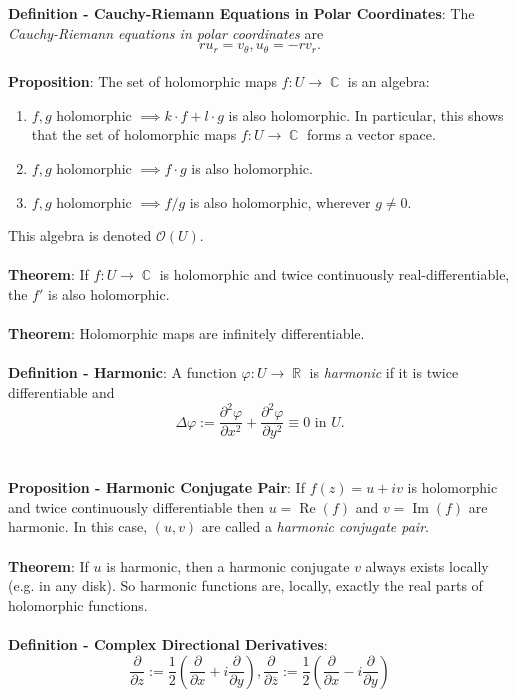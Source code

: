\documentclass{article}
\DeclareMathOperator{\R}{\mathbb{R}}
\DeclareMathOperator{\C}{\mathbb{C}}
\DeclareMathOperator{\re}{Re}
\DeclareMathOperator{\im}{Im}
\begin{document}
\textbf{Definition - Cauchy-Riemann Equations in Polar Coordinates}: The \textit{Cauchy-Riemann equations in polar coordinates} are $$ru_r = v_\theta, u_\theta = -rv_r.$$ \\
\textbf{Proposition}: The set of holomorphic maps $f: U \rightarrow \C$ is an algebra: \begin{enumerate}
    \item $f, g$ holomorphic $\implies k \cdot f + l \cdot g$ is also holomorphic. In particular, this shows that the set of holomorphic maps $f: U \rightarrow \C$ forms a vector space.
    \item $f, g$ holomorphic $\implies f \cdot g$ is also holomorphic.
    \item $f, g$ holomorphic $\implies f / g$ is also holomorphic, wherever $g \neq 0$.
\end{enumerate} This algebra is denoted $\mathcal{O}(U)$. \\\ \\
\textbf{Theorem}: If $f: U \rightarrow \C$ is holomorphic and twice continuously real-differentiable, the $f'$ is also holomorphic. \\ \\
\textbf{Theorem}: Holomorphic maps are infinitely differentiable. \\ \\
\textbf{Definition - Harmonic}: A function $\varphi: U \rightarrow \R$ is \textit{harmonic} if it is twice differentiable and $$\Delta \varphi := \frac{\partial^2 \varphi}{\partial x^2} + \frac{\partial^2 \varphi}{\partial y^2} \equiv 0 \text{ in } U.$$ \\ \\
\textbf{Proposition - Harmonic Conjugate Pair}: If $f(z) = u + iv$ is holomorphic and twice continuously differentiable then $u = \re(f)$ and $v = \im(f)$ are harmonic. In this case, $(u, v)$ are called a \textit{harmonic conjugate pair}. \\ \\
\textbf{Theorem}: If $u$ is harmonic, then a harmonic conjugate $v$ always exists locally (e.g. in any disk). So harmonic functions are, locally, exactly the real parts of holomorphic functions. \\ \\
\textbf{Definition - Complex Directional Derivatives}: $$\frac{\partial}{\partial z} := \frac{1}{2} \left( \frac{\partial}{\partial x} + i \frac{\partial}{\partial y} \right), \frac{\partial}{\partial \overline{z}} := \frac{1}{2} \left( \frac{\partial}{\partial x} - i \frac{\partial}{\partial y} \right)$$ \\ \\
\end{document}
